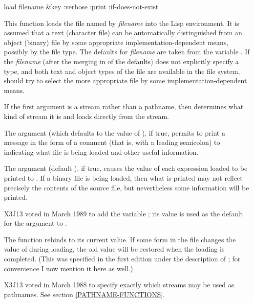 \begin{defun}[Function]
load filename &key :verbose :print :if-does-not-exist

This function loads the file named by {\it filename} into the Lisp
environment.  It is assumed that a text (character file) can be
automatically distinguished from an object (binary) file by some appropriate
implementation-dependent means, possibly by the file type.
The defaults for {\it filename} are taken from the variable
.
If the {\it filename} (after the merging in of the defaults)
does not explicitly specify a type,
and both text and object types of the file are available in the file system,
 should
try to select the more appropriate file by some implementation-dependent means.

If the first argument is a stream rather than a pathname,
then  determines what kind of stream it is and loads
directly from the stream.

The  argument (which defaults to the value of
), if true, permits  to print a message
in the form of a comment (that is, with a leading
semicolon) to  indicating what
file is being loaded and other useful information.

\begin{obsolete}
The  argument (default {\nil}),
if true, causes the value of each expression
loaded to be printed to .  If a binary file is
being loaded, then what is printed may not reflect precisely the contents
of the source file, but nevertheless some information will be printed.
\end{obsolete}
\begin{newer}
X3J13 voted in March 1989 
to add the variable ; its value is used as the default
for the  argument to .
\end{newer}

\begin{newer}
The function  rebinds  to its current value.  If
some form in the file changes the value of  during loading,
the old value will be restored when the loading is completed.
(This was specified in the first edition under the description of ;
for convenience I now mention it here as well.)
\end{newer}

\begin{new}
X3J13 voted in March 1988
to specify exactly which streams may be used as pathnames.
See section \ref{PATHNAME-FUNCTIONS}.
\end{new}


\end{defun}
